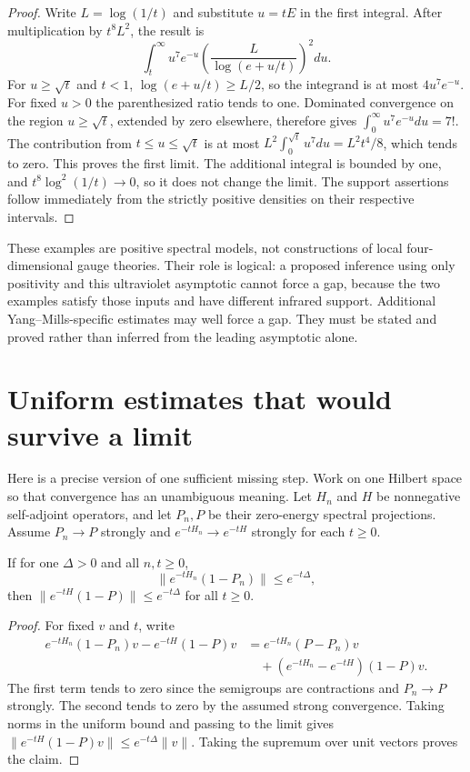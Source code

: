 \begin{proof}
Write $L=\log(1/t)$ and substitute $u=tE$ in the first integral.
After multiplication by $t^8L^2$, the result is
\[
 \int_t^\infty u^7e^{-u}
       \left(\frac{L}{\log(e+u/t)}\right)^2du.
\]
For $u\geq\sqrt t$ and $t<1$,
$\log(e+u/t)\geq L/2$, so the integrand is at most
$4u^7e^{-u}$.  For fixed $u>0$ the parenthesized ratio tends to one.
Dominated convergence on the region $u\geq\sqrt t$, extended by
zero elsewhere, therefore gives $\int_0^\infty u^7e^{-u}du=7!$.
The contribution from $t\leq u\leq\sqrt t$ is at most
$L^2\int_0^{\sqrt t}u^7du=L^2t^4/8$, which tends to zero.
This proves the first limit.  The additional integral is bounded by one,
and $t^8\log^2(1/t)\to0$, so it does not change the limit.
The support assertions follow immediately from the strictly positive
densities on their respective intervals.
\end{proof}

These examples are positive spectral models, not constructions of local
four-dimensional gauge theories.  Their role is logical: a proposed
inference using only positivity and this ultraviolet asymptotic cannot
force a gap, because the two examples satisfy those inputs and have
different infrared support.  Additional Yang--Mills-specific estimates may
well force a gap.  They must be stated and proved rather than inferred from
the leading asymptotic alone.

\section{Uniform estimates that would survive a limit}

Here is a precise version of one sufficient missing step.  Work on one
Hilbert space so that convergence has an unambiguous meaning.  Let $H_n$
and $H$ be nonnegative self-adjoint operators, and let $P_n,P$ be their
zero-energy spectral projections.  Assume
$P_n\to P$ strongly and
$e^{-tH_n}\to e^{-tH}$ strongly for each $t\geq0$.

\begin{proposition}
If for one $\Delta>0$ and all $n,t\geq0$,
\[
 \|e^{-tH_n}(1-P_n)\|\leq e^{-t\Delta},
\]
then $\|e^{-tH}(1-P)\|\leq e^{-t\Delta}$ for all $t\geq0$.
\end{proposition}

\begin{proof}
For fixed $v$ and $t$, write
\begin{align*}
 e^{-tH_n}(1-P_n)v-e^{-tH}(1-P)v
 &=e^{-tH_n}(P-P_n)v\\
 &\quad+(e^{-tH_n}-e^{-tH})(1-P)v.
\end{align*}
The first term tends to zero since the semigroups are contractions and
$P_n\to P$ strongly.  The second tends to zero by the assumed strong
convergence.  Taking norms in the uniform bound and passing to the limit
gives $\|e^{-tH}(1-P)v\|\leq e^{-t\Delta}\|v\|$.
Taking the supremum over unit vectors proves the claim.
\end{proof}

